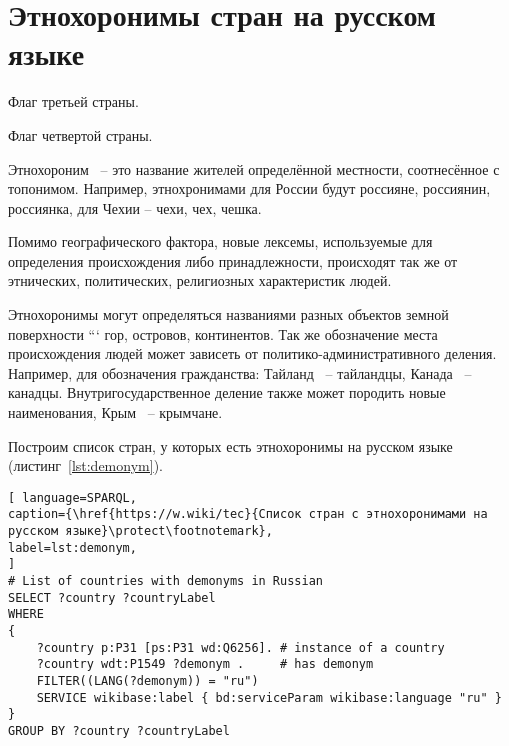 \section{Этнохоронимы стран на русском языке}

\begin{marginfigure}[0.0cm]
	{
		\setlength{\fboxsep}{0pt}%
		\setlength{\fboxrule}{1pt}%
	}
	\caption{Флаг третьей страны.}%
	\label{fig:flag_israel}%
\end{marginfigure}
\begin{marginfigure}[0.0cm]
	{
		\setlength{\fboxsep}{0pt}%
		\setlength{\fboxrule}{1pt}%
	}
	\caption{Флаг четвертой страны.}%
	\label{fig:flag_mongolia}%
\end{marginfigure}

Этнохороним ~-- это название жителей определённой местности, соотнесённое с топонимом. Например, этнохронимами для России будут россияне, россиянин, россиянка, для Чехии – чехи, чех, чешка.

Помимо географического фактора, новые лексемы, используемые для определения происхождения либо принадлежности, происходят так же от этнических, политических, религиозных характеристик людей\cite{Zhuravleva2012}. 

Этнохоронимы могут определяться названиями разных объектов земной поверхности ``` гор, островов, континентов. Так же обозначение места происхождения людей может зависеть от политико-административного деления. Например, для обозначения гражданства: Тайланд ~-- тайландцы, Канада ~-- канадцы. Внутригосударственное деление также может породить новые наименования, Крым ~-- крымчане.

Построим список стран, у которых есть этнохоронимы на русском языке (листинг~\ref{lst:demonym}).


\begin{lstlisting}[ language=SPARQL, 
caption={\href{https://w.wiki/tec}{Список стран с этнохоронимами на русском языке}\protect\footnotemark},
label=lst:demonym, 
]
# List of countries with demonyms in Russian
SELECT ?country ?countryLabel 
WHERE
{
	?country p:P31 [ps:P31 wd:Q6256]. # instance of a country
	?country wdt:P1549 ?demonym .     # has demonym
	FILTER((LANG(?demonym)) = "ru")
	SERVICE wikibase:label { bd:serviceParam wikibase:language "ru" }
}
GROUP BY ?country ?countryLabel
\end{lstlisting}

